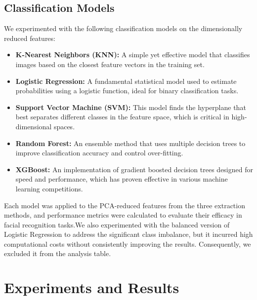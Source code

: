 \documentclass[a4paper]{article}
\theoremstyle{plain}
\theoremstyle{definition}
\begin{document}
\subsection*{Classification Models}

We experimented with the following classification models on the dimensionally reduced features:

\begin{itemize}
    \item \textbf{K-Nearest Neighbors (KNN)\cite{knn}:} A simple yet effective model that classifies images based on the closest feature vectors in the training set.
    \item \textbf{Logistic Regression:} A fundamental statistical model used to estimate probabilities using a logistic function, ideal for binary classification tasks.
    \item \textbf{Support Vector Machine (SVM)\cite{svm}:} This model finds the hyperplane that best separates different classes in the feature space, which is critical in high-dimensional spaces.
    \item \textbf{Random Forest\cite{randomforest}:} An ensemble method that uses multiple decision trees to improve classification accuracy and control over-fitting.
    \item \textbf{XGBoost\cite{xgboost}:} An implementation of gradient boosted decision trees designed for speed and performance, which has proven effective in various machine learning competitions.
\end{itemize}

Each model was applied to the PCA-reduced features from the three extraction methods, and performance metrics were calculated to evaluate their efficacy in facial recognition tasks.We also experimented with the balanced version of Logistic Regression to address the significant class imbalance, but it incurred high computational costs without consistently improving the results. Consequently, we excluded it from the analysis table.
	\newpage

	
	\section{Experiments and Results}
\end{document}
